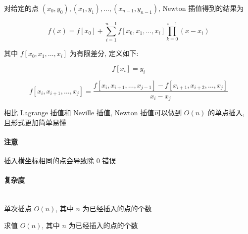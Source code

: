 对给定的点 \((x_0,y_0),(x_1,y_1),\dots,(x_{n-1},y_{n-1})\), Newton 插值得到的结果为

\[
    f(x)=f[x_0]+\sum_{i=1}^{n-1}f[x_0,x_1,\dots,x_i]\prod_{k=0}^{i-1}(x-x_i)
\]

其中 \(f[x_0,x_1,\dots,x_i]\) 为有限差分, 定义如下:

\[
    f[x_i]=y_i
\]

\[
    f[x_i,x_{i+1},\dots,x_j]=\dfrac{f[x_i,x_{i+1},\dots,x_{j-1}]-f[x_{i+1},x_{i+2},\dots,x_j]}{x_i-x_j}
\]

相比 Lagrange 插值和 Neville 插值, Newton 插值可以做到 \(O(n)\) 的单点插入, 且形式更加简单易懂

\paragraph{注意}

插入横坐标相同的点会导致除 \(0\) 错误

\paragraph{复杂度}~\\

单次插点 \(O(n)\), 其中 \(n\) 为已经插入的点的个数

求值 \(O(n)\), 其中 \(n\) 为已经插入的点的个数
